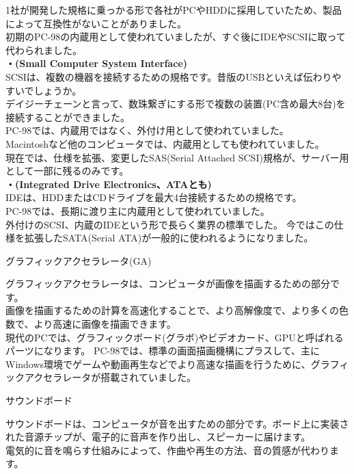 \documentclass[b5paper,9pt,platex,dvipdfmx]{jsarticle}
\begin{document}
\begin{multicols}{3}
\begin{enumerate}
  1社が開発した規格に乗っかる形で各社がPCやHDDに採用していたため、製品によって互換性がないことがありました。\\
  初期のPC-98の内蔵用として使われていましたが、すぐ後にIDEやSCSIに取って代わられました。\\
  {\bf・(Small Computer System Interface)\\}
  SCSIは、複数の機器を接続するための規格です。昔版のUSBといえば伝わりやすいでしょうか。\\
  デイジーチェーンと言って、数珠繋ぎにする形で複数の装置(PC含め最大8台)を接続することができました。\\
  PC-98では、内蔵用ではなく、外付け用として使われていました。\\
  Macintoshなど他のコンピュータでは、内蔵用としても使われていました。\\
  現在では、仕様を拡張、変更したSAS(Serial Attached SCSI)規格が、サーバー用として一部に残るのみです。\\
  {\bf・(Integrated Drive Electronics、ATAとも)\\}
  IDEは、HDDまたはCDドライブを最大4台接続するための規格です。\\
  PC-98では、長期に渡り主に内蔵用として使われていました。\\
  外付けのSCSI、内蔵のIDEという形で長らく業界の標準でした。
  今ではこの仕様を拡張したSATA(Serial ATA)が一般的に使われるようになりました。\\
  {\bf  \item グラフィックアクセラレータ(GA)\\}
  グラフィックアクセラレータは、コンピュータが画像を描画するための部分です。\\
  画像を描画するための計算を高速化することで、より高解像度で、より多くの色数で、より高速に画像を描画できます。\\
  現代のPCでは、グラフィックボード(グラボ)やビデオカード、GPUと呼ばれるパーツになります。
  PC-98では、標準の画面描画機構にプラスして、主にWindows環境でゲームや動画再生などでより高速な描画を行うために、グラフィックアクセラレータが搭載されていました。\\
  {\bf  \item サウンドボード\\}
  サウンドボードは、コンピュータが音を出すための部分です。ボード上に実装された音源チップが、電子的に音声を作り出し、スピーカーに届けます。\\
  電気的に音を鳴らす仕組みによって、作曲や再生の方法、音の質感が代わります。\\

\end{enumerate}
\end{multicols}
\end{document}
